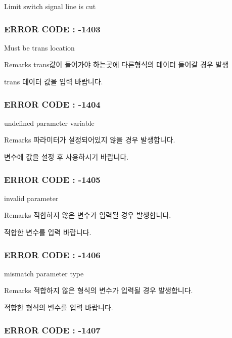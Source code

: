 Limit switch signal line is cut



 \subsubsection*{E\-R\-R\-O\-R C\-O\-D\-E \-: -\/1403 }

Must be trans location \begin{DoxyRemark}{Remarks}
trans값이 들어가야 하는곳에 다른형식의 데이터 들어갈 경우 발생\par
 trans 데이터 값을 입력 바랍니다.
\end{DoxyRemark}


 \subsubsection*{E\-R\-R\-O\-R C\-O\-D\-E \-: -\/1404 }

undefined parameter variable \begin{DoxyRemark}{Remarks}
파라미터가 설정되어있지 않을 경우 발생합니다.\par
 변수에 값을 설정 후 사용하시기 바랍니다.
\end{DoxyRemark}


 \subsubsection*{E\-R\-R\-O\-R C\-O\-D\-E \-: -\/1405 }

invalid parameter \begin{DoxyRemark}{Remarks}
적합하지 않은 변수가 입력될 경우 발생합니다.\par
 적합한 변수를 입력 바랍니다.
\end{DoxyRemark}


 \subsubsection*{E\-R\-R\-O\-R C\-O\-D\-E \-: -\/1406 }

mismatch parameter type \begin{DoxyRemark}{Remarks}
적합하지 않은 형식의 변수가 입력될 경우 발생합니다.\par
 적합한 형식의 변수를 입력 바랍니다.
\end{DoxyRemark}


 \subsubsection*{E\-R\-R\-O\-R C\-O\-D\-E \-: -\/1407 }


